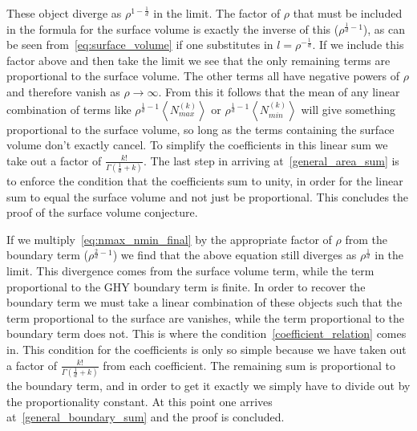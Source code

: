 \documentclass[12pt]{article}
\begin{document}
These object diverge as $\rho^{1-\frac{1}{d}}$ in the limit. The factor of $\rho$ that must be included in the formula for the surface volume is exactly the inverse of this ($\rho^{\frac{1}{d}-1}$), as can be seen from~\eqref{eq:surface_volume} if one substitutes in $l=\rho^{-\frac{1}{d}}$. If we include this factor above and then take the limit we see that the only remaining terms are proportional to the surface volume. The other terms all have negative powers of $\rho$ and therefore vanish as $\rho\rightarrow\infty$. From this it follows that the mean of any linear combination of terms like $\rho^{\frac{1}{d}-1}\left\langle N_{max}^{(k)}\right\rangle$ or $\rho^{\frac{1}{d}-1}\left\langle N_{min}^{(k)}\right\rangle$ will give something proportional to the surface volume, so long as the terms containing the surface volume don't exactly cancel. To simplify the coefficients in this linear sum we take out a factor of $\frac{k!}{\Gamma\left(\frac{1}{d}+k\right)}$. The last step in arriving at~\eqref{general_area_sum} is to enforce the condition that the coefficients sum to unity, in order for the linear sum to equal the surface volume and not just be proportional. This concludes the proof of the surface volume conjecture. 

If we multiply~\eqref{eq:nmax_nmin_final} by the appropriate factor of $\rho$ from the boundary term ($\rho^{\frac{2}{d}-1}$) we find that the above equation still diverges as $\rho^{\frac{1}{d}}$ in the limit. This divergence comes from the surface volume term, while the term proportional to the GHY boundary term is finite. In order to recover the boundary term we must take a linear combination of these objects such that the term proportional to the surface are vanishes, while the term proportional to the boundary term does not. This is where the condition~\eqref{coefficient_relation} comes in. This condition for the coefficients is only so simple because we have taken out a factor of $\frac{k!}{\Gamma\left(\frac{1}{d}+k\right)}$ from each coefficient. The remaining sum is proportional to the boundary term, and in order to get it exactly we simply have to divide out by the proportionality constant. At this point one arrives at~\eqref{general_boundary_sum} and the proof is concluded.
\end{document}
